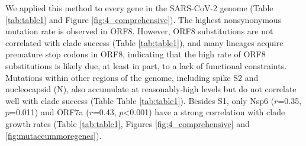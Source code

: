 \documentclass[11pt,oneside,letterpaper]{article}
\begin{document}
We applied this method to every gene in the SARS-CoV-2 genome (Table \ref{tab:table1} and Figure \ref{fig:4_comprehensive}). The highest nonsynonymous mutation rate is observed in ORF8. 
However, ORF8 substitutions are not correlated with clade success (Table \ref{tab:table1}), and many lineages acquire premature stop codons in ORF8, indicating that the high rate of ORF8 substitutions is likely due, at least in part, to a lack of functional constraints. 
Mutations within other regions of the genome, including spike S2 and nucleocapsid (N), also accumulate at reasonably-high levels but do not correlate well with clade success (Table Table \ref{tab:table1}). 
Besides S1, only Nsp6 ($r$=0.35, $p$=0.011) and ORF7a ($r$=0.43, $p$\textless0.001) have a strong correlation with clade growth rates (Table \ref{tab:table1}, Figures \ref{fig:4_comprehensive} and \ref{fig:mutaccummoregenes}).
\end{document}
